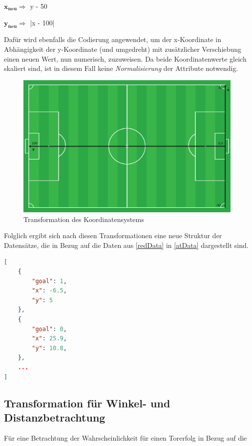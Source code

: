 \centerline{$\boldsymbol{x_{neu}} \Rightarrow$ y - 50 }
\centerline{$\boldsymbol{y_{neu}} \Rightarrow$ |x - 100|}

Dafür wird ebenfalls die Codierung angewendet, um der x-Koordinate in Abhängigkeit der y-Koordinate (und umgedreht) mit zusätzlicher Verschiebung einen neuen Wert, nun numerisch, zuzuweisen. Da beide Koordinatenwerte gleich skaliert sind, ist in diesem Fall keine \textit{Normalisierung} der Attribute notwendig.

\begin{figure}[H]
\centering
\includegraphics[scale=0.27]{se-wa-jpg/transf_pitch}
\caption[Transformation des Koordinatensystems]{Transformation des Koordinatensystems}
\label{transf_pitch}
\end{figure}

\enlargethispage{2\baselineskip} Folglich ergibt sich nach diesen Transformationen eine neue Struktur der Datensätze, die in Bezug auf die Daten aus \vref{redData} in \vref{atData} dargestellt sind.\newline

\begin{lstlisting}[caption=\captionListingText,language=json,xleftmargin=5mm,label=atData] 
[
	{
		"goal": 1,
		"x": -6.5,
		"y": 5
	},
	{
		"goal": 0,
		"x": 25.9,
		"y": 10.8,
	},
	...
]
\end{lstlisting}



\subsection{Transformation für Winkel- und Distanzbetrachtung}
\label{wdt}
Für eine Betrachtung der Wahrscheinlichkeit für einen Torerfolg in Bezug auf die

